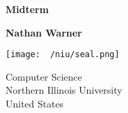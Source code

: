 \documentclass{report}
\title{\Huge{}}
\author{\huge{Nathan Warner}}
\date{\huge{}}
\begin{document}
        \begin{titlepage}
       \begin{center}
           \vspace*{1cm}
    
           \textbf{Midterm}
    
           \vspace{0.5cm}
            
                
           \vspace{1.5cm}
    
           \textbf{Nathan Warner}
    
           \vfill
                
                
           \vspace{0.8cm}
         
           \texttt{[image: ~/niu/seal.png]}
                
           Computer Science \\
           Northern Illinois University\\
           United States\\
           
                
       \end{center}
    \end{titlepage}
    \tableofcontents
    \pagebreak 
\end{document}
